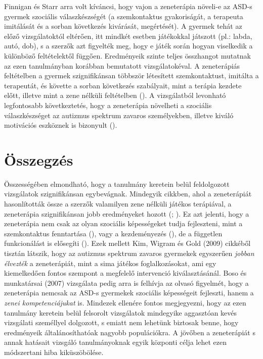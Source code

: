 Finnigan és Starr arra volt kíváncsi, hogy vajon a zeneterápia növeli-e az ASD-s gyermek szociális válaszkészségét (a szemkontaktus gyakoriságát, a terapeuta imitálá\-sát és a sorban  következés kivárását, megértését). A gyermek tehát az előző vizsgála\-toktól eltérően, itt mindkét esetben játékokkal játszott (pl.: labda, autó, dob), s a szerzők azt figyelték meg, hogy e játék során hogyan viselkedik a különböző feltételektől függően. Eredményeik szinte teljes összhangot mutatnak az ezen tanulmányban korábban bemutatott vizsgálatokéval. A zeneterápiás feltételben a gyermek szignifikánsan többször létesí\-tett szemkontaktust, imitálta a terapeutát, és követte a sorban következés szabályait, mint a terápia kezdete előtt, illetve mint a zene nélküli feltételben (\cite{finnigan_starr_2010}). A vizsgálatból levonható legfontosabb következtetés, hogy a zeneterápia növelheti a szociális válaszkészséget az autizmus spektrum zavaros személyekben, illetve kiváló motivációs eszköznek is bizonyult (\cite{finnigan_starr_2010}).
\pagebreak

\section*{Összegzés}

Összességében elmondható, hogy a tanulmány keretein belül feldolgozott vizsgálatok szignifikánsan egybevágnak. Mindegyik cikkben, ahol a zeneterápiát hasonlították össze a szerzők valamilyen zene nélküli játékos terápiával, a zeneterápia szignifikánsan jobb eredményeket hozott (\cite{finnigan_starr_2010}; \cite{kim_wigram_gold_2009}). Ez azt jelenti, hogy a zeneterápia nem csak az olyan szociális képességeket  tudja fejleszteni, mint a szemkontaktus fenntartása (\cite{finnigan_starr_2010}), vagy a kezdeményezés (\cite{kim_wigram_gold_2009}), de a független funkcionálást is elősegíti (\cite{kern_wolery_aldridge_2006}). Ezek mellett Kim, Wigram és Gold (2009) cikkéből tisztán látszik, hogy az autizmus spektrum zavaros gyermekek egyszerűen \textit{jobban élvezték} a zeneterápiát, mint a sima játékos foglalkozásokat, ami egy kiemelkedően fontos szempont a megfelelő intervenció kiválasztásánál. Boso és munkatársai (2007) vizsgálata pedig arra is felhívja az olvasó figyelmét, hogy a zeneterápia nemcsak az ASD-s gyermekek szociális képességeit fejleszti, hanem a \textit{zenei kompetenciájukat} is. Mindezek ellenére fontos megjegyezni, hogy az ezen tanulmány keretein belül felsorolt vizsgálatok mindegyike aggasztóan kevés vizsgálati személlyel dolgozott, s emiatt nem lehetünk biztosak benne, hogy eredményeik általánosíthatóak nagyobb populációkra. A jövőben a zeneterápiát s annak hatásait vizsgáló tanulmányoknak egyik központi célja lehet ezen módszertani hiba kiküszöbölése.